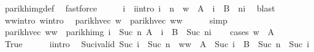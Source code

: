 \begin{isabellebody}
\ parikh{\isacharunderscore}{\kern0pt}img{\isacharunderscore}{\kern0pt}def\ \isamarkupfalse%
\ fastforce\isanewline
\ \ \isamarkupfalse%
\ \isamarkupfalse%
\ i\ \ i{\isacharunderscore}{\kern0pt}intro{\isacharcolon}{\kern0pt}\ {\isachardoublequoteopen}i\ {\isasymle}\ n\ {\isasymand}\ w{}{\isacharprime}{\kern0pt}\ {\isasymin}\ A\ {\isacharcircum}{\kern0pt}{\isacharcircum}{\kern0pt}\ i\ {\isacharat}{\kern0pt}{\isacharat}{\kern0pt}\ B\ {\isacharcircum}{\kern0pt}{\isacharcircum}{\kern0pt}\ {\isacharparenleft}{\kern0pt}n{\isacharminus}{\kern0pt}i{\isacharparenright}{\kern0pt}{\isachardoublequoteclose}\ \isamarkupfalse%
\ blast\isanewline
\isanewline
\ \ \isamarkupfalse%
\ w{}{\isacharunderscore}{\kern0pt}w{}{\isacharunderscore}{\kern0pt}intro\ w{}{\isacharprime}{\kern0pt}{\isacharunderscore}{\kern0pt}intro\ \isamarkupfalse%
\ {\isachardoublequoteopen}parikh{\isacharunderscore}{\kern0pt}vec\ w\ {\isacharequal}{\kern0pt}\ parikh{\isacharunderscore}{\kern0pt}vec\ {\isacharparenleft}{\kern0pt}w{}{\isacharat}{\kern0pt}w{}{\isacharprime}{\kern0pt}{\isacharparenright}{\kern0pt}{\isachardoublequoteclose}\isanewline
\ \ \ \ \isamarkupfalse%
\ simp\isanewline
\ \ \isamarkupfalse%
\ \isamarkupfalse%
\ {\isachardoublequoteopen}parikh{\isacharunderscore}{\kern0pt}vec\ {\isacharparenleft}{\kern0pt}w{}{\isacharat}{\kern0pt}w{}{\isacharprime}{\kern0pt}{\isacharparenright}{\kern0pt}\ {\isasymin}\ parikh{\isacharunderscore}{\kern0pt}img\ {\isacharparenleft}{\kern0pt}{\isasymUnion}i\ {\isasymle}\ Suc\ n{\isachardot}{\kern0pt}\ A\ {\isacharcircum}{\kern0pt}{\isacharcircum}{\kern0pt}\ i\ {\isacharat}{\kern0pt}{\isacharat}{\kern0pt}\ B\ {\isacharcircum}{\kern0pt}{\isacharcircum}{\kern0pt}\ {\isacharparenleft}{\kern0pt}Suc\ n{\isacharminus}{\kern0pt}i{\isacharparenright}{\kern0pt}{\isacharparenright}{\kern0pt}{\isachardoublequoteclose}\isanewline
\ \ \isamarkupfalse%
\ {\isacharparenleft}{\kern0pt}cases\ {\isachardoublequoteopen}w{}\ {\isasymin}\ A{\isachardoublequoteclose}{\isacharparenright}{\kern0pt}\isanewline
\ \ \ \ \isamarkupfalse%
\ True\isanewline
\ \ \ \ \isamarkupfalse%
\ i{\isacharunderscore}{\kern0pt}intro\ \isamarkupfalse%
\ Suc{\isacharunderscore}{\kern0pt}i{\isacharunderscore}{\kern0pt}valid{\isacharcolon}{\kern0pt}\ {\isachardoublequoteopen}Suc\ i\ {\isasymle}\ Suc\ n{\isachardoublequoteclose}\ \ {\isachardoublequoteopen}w{}{\isacharat}{\kern0pt}w{}{\isacharprime}{\kern0pt}\ {\isasymin}\ A\ {\isacharcircum}{\kern0pt}{\isacharcircum}{\kern0pt}\ {\isacharparenleft}{\kern0pt}Suc\ i{\isacharparenright}{\kern0pt}\ {\isacharat}{\kern0pt}{\isacharat}{\kern0pt}\ B\ {\isacharcircum}{\kern0pt}{\isacharcircum}{\kern0pt}\ {\isacharparenleft}{\kern0pt}Suc\ n\ {\isacharminus}{\kern0pt}\ Suc\ i{\isacharparenright}{\kern0pt}{\isachardoublequoteclose}\isanewline

\end{isabellebody}
